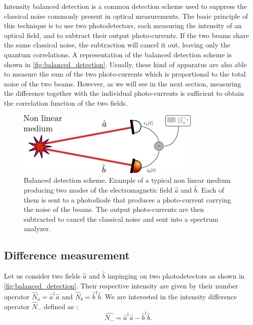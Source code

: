 Intensity balanced detection is a common detection scheme used to suppress the classical noise commonly present in optical measurements.
The basic principle of this technique is to use two photodetectors, each measuring the intensity of an optical field, and to subtract their output photo-currents. If the two 
beams share the same classical noise, the subtraction will cancel it out, leaving only the quantum correlations. A representation of the balanced detection scheme is shown in \autoref{fig:balanced_detection}.
Usually, these kind of apparatus are also able to measure the sum of the two photo-currents which is proportional to the total noise of the two beams. However,
as we will see in the next section, measuring the difference together with the individual photo-currents is sufficient to obtain the correlation function of the two fields.
\begin{figure}
    \centering
    \includegraphics[width=0.8\textwidth]{chap_correlation/fig/balanced_detection.pdf}
    \caption{Balanced detection scheme. Example of a typical non linear medium producing two modes of the electromagnetic field $\hat{a}$ and $\hat{b}$. Each of them is sent to a photodiode that produces a photo-current carrying the noise
    of the beams. The output photo-currents are then subtracted to cancel the classical noise and sent into a spectrum analyzer.}
    \label{fig:balanced_detection}
\end{figure} 

\subsection{Difference measurement}
Let us consider two fields $\hat{a}$ and $\hat{b}$ impinging on two photodetectors as shown in \autoref{fig:balanced_detection}. Their respective intensity 
are given by their number operator $\hat{N}_a=\hat{a}^\dagger\hat{a}$ and $\hat{N}_b=\hat{b}^\dagger\hat{b}$.
We are interested in the intensity difference operator $\hat{N}_-$ defined as :
\begin{equation}
    \label{eq:diff_op}
    \hat{N_-} = \hat{a}^\dagger\hat{a} - \hat{b}^\dagger\hat{b}.
\end{equation}

